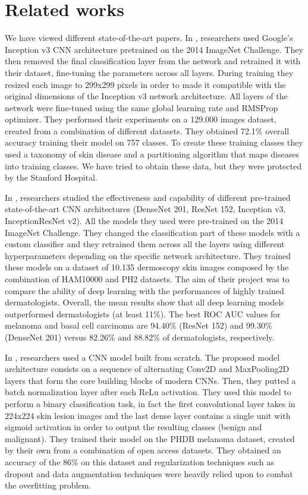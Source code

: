 \section{Related works} \label{related_works}

	We have viewed different state-of-the-art papers. 
	In \cite{article1}, researchers used Google's Inception v3 CNN architecture pretrained on the 2014 ImageNet Challenge. They then removed the final classification layer from the network and retrained it with their dataset, fine-tuning the parameters across all layers. During training they resized each image to 299x299 pixels in order to made it compatible with the original dimensions of the Inception v3 network architecture. All layers of the network were fine-tuned using the same global learning rate and RMSProp optimizer. They performed their experiments on a 129.000 images dataset, created from a combination of different datasets. They obtained 72.1\% overall accuracy training their model on 757 classes. To create these training classes they used a taxonomy of skin disease and a partitioning algorithm that maps diseases into training classes. We have tried to obtain these data, but they were protected by the Stanford Hospital.
	
	\smallskip
	
	In \cite{article3}, researchers studied the effectiveness and capability of different pre-trained state-of-the-art CNN architectures (DenseNet 201, ResNet 152, Inception v3, InceptionResNet v2). All the models they used were pre-trained on the 2014 ImageNet Challenge. They changed the classification part of these models with a custom classifier and they retrained them across all the layers using different hyperparameters depending on the specific network architecture. They trained these models on a dataset of 10.135 dermoscopy skin images composed by the combination of HAM10000 and PH2\cite{ph2} datasets.  The aim of their project was to compare the ability of deep learning with the performances of highly trained dermatologists. Overall, the mean results show that all deep learning models outperformed dermatologists (at least 11\%). The best ROC AUC values for melanoma and basal cell carcinoma are 94.40\% (ResNet 152) and 99.30\% (DenseNet 201) versus 82.26\% and 88.82\% of dermatologists, respectively.
	
	\smallskip

	In \cite{article2}, researchers used a CNN model built from scratch. The proposed model architecture consists on a sequence of alternating Conv2D and MaxPooling2D layers that form the core building blocks of modern CNNs. Then, they putted a batch normalization layer after each ReLu activation. They used this model to perform a binary classification task, in fact the first convolutional layer takes in 224x224 skin lesion images and the last dense layer contains a single unit with sigmoid activation in order to output the resulting classes (benign and malignant). They trained their model on the PHDB melanoma dataset, created by their own from a combination of open access datasets. They obtained an accuracy of the 86\% on this dataset and regularization techniques such as dropout and data augmentation techniques were heavily relied upon to combat the overfitting problem.
	
